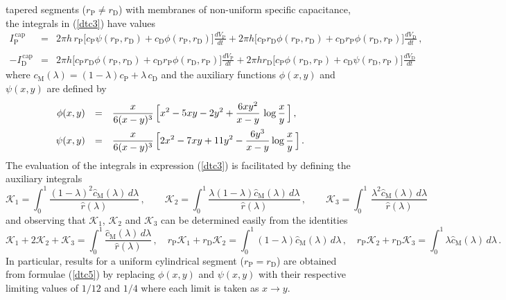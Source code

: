 tapered segments ($r_\mathrm{P}\ne r_\mathrm{D}$) with membranes
of non-uniform specific capacitance, the integrals in (\ref{dtc3})
have values
\begin{eqnarray}
I^\mathrm{\,cap}_\mathrm{P} & = & 2\pi h
\,r_\mathrm{P}\Big[c_\mathrm{P}\psi(r_\mathrm{P},r_\mathrm{D})
+c_\mathrm{D}\phi(r_\mathrm{P},r_\mathrm{D})\Big]
\frac{dV_\mathrm{P}}{dt}+2\pi h\Big[c_\mathrm{P}r_\mathrm{D}
\phi(r_\mathrm{P},r_\mathrm{D})+c_\mathrm{D}r_\mathrm{P}
\phi(r_\mathrm{D},r_\mathrm{P})\Big]\frac{dV_\mathrm{D}}{dt}\,,\nonumber\\
&&\label{dtc5}\\
-I^\mathrm{\,cap}_\mathrm{D} & = & 2\pi h
\Big[c_\mathrm{P}r_\mathrm{D}\phi(r_\mathrm{P},r_\mathrm{D})
+c_\mathrm{D}r_\mathrm{P}\phi(r_\mathrm{D},r_\mathrm{P})\Big]
\frac{dV_\mathrm{P}}{dt}+2\pi h r_\mathrm{D}\Big[c_\mathrm{P}
\phi(r_\mathrm{D},r_\mathrm{P})+c_\mathrm{D}\psi(r_\mathrm{D},
r_\mathrm{P})\Big]\frac{dV_\mathrm{D}}{dt}\nonumber
\end{eqnarray}
where $c_\mathrm{M}(\lambda)=(1-\lambda)c_\mathrm{P}+\lambda\,
c_\mathrm{D}$ and the auxiliary functions $\phi(x,y)$ and
$\psi(x,y)$ are defined by
\begin{equation}\label{dtc6}
\begin{array}{rcl}
\phi(x,y) & = & \displaystyle\frac{x}{6(x-y)^3}\,\Big[x^2-5xy-2y^2
+\frac{6xy^2}{x-y}\,\log\frac{x}{y}\,\Big]\,,\\[10pt]
\psi(x,y) & = & \displaystyle\frac{x}{6(x-y)^3}\,\Big[2x^2-7xy+11y^2
-\frac{6y^3}{x-y}\log\frac{x}{y}\,\Big]\,.
\end{array}
\end{equation}
The evaluation of the integrals in expression (\ref{dtc3}) is
facilitated by defining the auxiliary integrals
\[
\mathcal{K}_1= \int_0^1\frac{(1-\lambda)^2
\widehat{c}_\mathrm{M}(\lambda)\,d\lambda}
{\widehat{r}(\lambda)}\,,\qquad \mathcal{K}_2=\int_0^1
\frac{\lambda(1-\lambda)\widehat{c}_\mathrm{M}(\lambda)\,d\lambda}
{\widehat{r}(\lambda)}\,,\qquad
\mathcal{K}_3=\int_0^1\,\frac{\lambda^2\widehat{c}_\mathrm{M}(\lambda)\,d\lambda}
{\widehat{r}(\lambda)}
\]
and observing that $\mathcal{K}_1$, $\mathcal{K}_2$ and
$\mathcal{K}_3$ can be determined easily from the identities
\[
\mathcal{K}_1+2\mathcal{K}_2+\mathcal{K}_3=
\int_0^1\frac{\widehat{c}_\mathrm{M}(\lambda)\,d\lambda}{\widehat{r}(\lambda)}\,,\quad
r_\mathrm{P}\mathcal{K}_1+r_\mathrm{D}\mathcal{K}_2=\int_0^1
(1-\lambda)\widehat{c}_\mathrm{M}(\lambda)\,d\lambda\,,\quad
r_\mathrm{P}\mathcal{K}_2+r_\mathrm{D}\mathcal{K}_3=\int_0^1
\lambda\widehat{c}_\mathrm{M}(\lambda)\,d\lambda\,.
\]
In particular, results for a uniform cylindrical segment
($r_\mathrm{P}=r_\mathrm{D}$) are obtained from formulae
(\ref{dtc5}) by replacing $\phi(x,y)$ and $\psi(x,y)$ with their
respective limiting values of $1/12$ and $1/4$ where each limit is
taken as $x\to y$.

